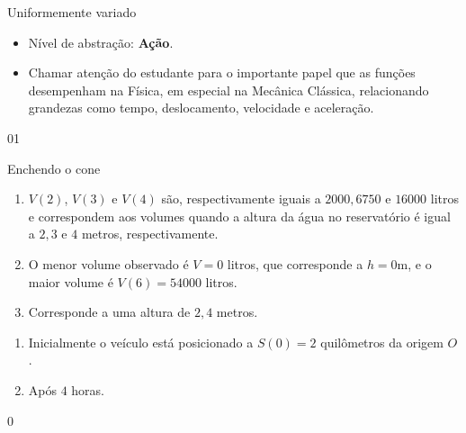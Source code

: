 \begin{sugestions}{Uniformemente variado}
{
\begin{itemize}
\item Nível de abstração: \textbf{Ação}.

\item Chamar atenção do estudante para o importante papel que as funções desempenham na Física, em especial na Mecânica Clássica, relacionando grandezas como tempo, deslocamento, velocidade e aceleração.
\end{itemize}
}{0}{1}
\end{sugestions}
\begin{answer}{Enchendo o cone}
{
\begin{enumerate}

\item $V(2)$, $V(3)$ e $V(4)$ são, respectivamente iguais a $2000, 6750$ e $16000$ litros e correspondem aos volumes quando a altura da água no reservatório é igual a $2,3$ e $4$ metros, respectivamente.

\item O menor volume observado é $V=0$ litros, que corresponde a $h=0$m, e o maior volume é $V(6)=54000$ litros.

\item Corresponde a uma altura de $2,4$ metros.

\end{enumerate}


\begin{enumerate}
\item Inicialmente o veículo está posicionado a $S(0)=2$ quilômetros da origem $O$.

\item Após $4$ horas.

\end{enumerate}
}{0}
\end{answer}


